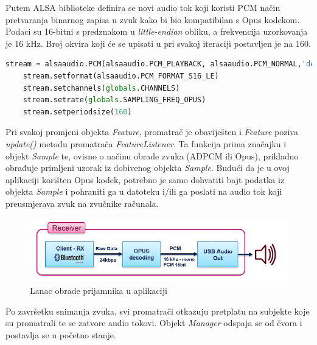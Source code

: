 Putem ALSA biblioteke definira se novi audio tok koji koristi PCM način pretvaranja binarnog zapisa u zvuk kako bi bio kompatibilan s Opus kodekom. Podaci su 16-bitni s predznakom u \textit{little-endian} obliku, a frekvencija uzorkovanja je 16 kHz. Broj okvira koji će se upisati u pri svakoj iteraciji postavljen je na 160. 

\begin{lstlisting}[language=Python, caption={Postavljanje parametara za dekodiranje audio signala}]
	stream = alsaaudio.PCM(alsaaudio.PCM_PLAYBACK, alsaaudio.PCM_NORMAL,'default')
	stream.setformat(alsaaudio.PCM_FORMAT_S16_LE)
	stream.setchannels(globals.CHANNELS)
	stream.setrate(globals.SAMPLING_FREQ_OPUS)
	stream.setperiodsize(160)
\end{lstlisting}

Pri svakoj promjeni objekta \textit{Feature}, promatrač je obaviješten i \textit{Feature} poziva \textit{update()} metodu promatrača \textit{FeatureListener}. Ta funkcija prima značajku i objekt \textit{Sample} te, ovisno o načinu obrade zvuka (ADPCM ili Opus), prikladno obrađuje primljeni uzorak iz dobivenog objekta \textit{Sample}. Budući da je u ovoj aplikaciji korišten Opus kodek, potrebno je samo dohvatiti bajt podatka iz objekta \textit{Sample} i pohraniti ga u datoteku i/ili ga poslati na audio tok koji preusmjerava zvuk na zvučnike računala. 

\begin{figure}[ht]
	\includegraphics[width=\linewidth]{imgs/duplex_chain_2}
	\caption{Lanac obrade prijamnika u aplikaciji \cite{fpaudbvlink}}
	\label{fig:duplex_chain_2}
\end{figure}

Po završetku snimanja zvuka, svi promatrači otkazuju pretplatu na subjekte koje su promatrali te se zatvore audio tokovi. Objekt \textit{Manager} odspaja se od čvora i postavlja se u početno stanje.
